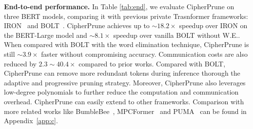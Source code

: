 \noindent\textbf{End-to-end performance.}
In Table \ref{tab:end}, we evaluate CipherPrune on three BERT models, comparing it with previous private Trasnformer frameworks: IRON~\citep{hao2022iron-iron} and BOLT~\citep{pang2023bolt}. %
CipherPrune achieves up to $\sim18.2\times$ speedup over IRON on the BERT-Large model and $\sim8.1\times$ speedup over vanilla BOLT without W.E.. When compared with BOLT with the word elimination technique, CipherPrune is still $\sim3.9\times$ faster without compromising accuracy. Communication costs are also reduced by $2.3\sim40.4\times$ compared to prior works. Compared with BOLT, CipherPrune can remove more redundant tokens during inference thorough the adaptive and progressive pruning strategy. Moreover, CipherPrune also leverages low-degree polynomials to further reduce the computation and communication overhead. CipherPrune can easily extend to other frameworks. Comparison with more related works like BumbleBee~\citep{lu2023bumblebee}, MPCFormer~\citep{li2022mpcformer} and PUMA~\citep{dong2023puma} can be found in Appendix~\ref{app:c}. 





